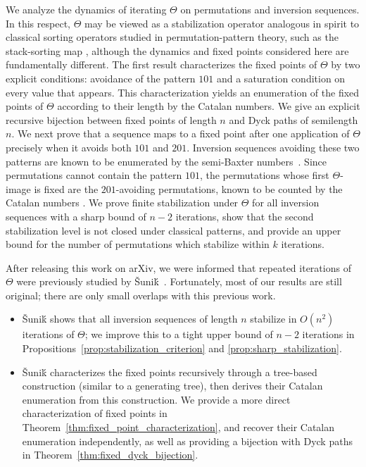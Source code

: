 \documentclass[11pt]{article}
\theoremstyle{remark}
\theoremstyle{definition}
\begin{document}
We analyze the dynamics of iterating $\Theta$ on permutations and inversion sequences. In this respect, $\Theta$ may be viewed as a stabilization operator analogous in spirit to classical sorting operators studied in permutation-pattern theory, such as the stack-sorting map \cite{Albert_Bouvel_Feray_2020,West_1993}, although the dynamics and fixed points considered here are fundamentally different. The first result characterizes the fixed points of $\Theta$ by two explicit conditions: avoidance of the pattern $101$ and a saturation condition on every value that appears. This characterization yields an enumeration of the fixed points of $\Theta$ according to their length by the Catalan numbers. We give an explicit recursive bijection between fixed points of length $n$ and Dyck paths of semilength $n$. We next prove that a sequence maps to a fixed point after one application of $\Theta$ precisely when it avoids both $101$ and $201$. Inversion sequences avoiding these two patterns are known to be enumerated by the semi-Baxter numbers~\cite{Bouvel_Guerrini_Rechnitzer_Rinaldi_2018,Martinez_Savage_2018}. 
Since permutations cannot contain the pattern $101$, the permutations whose first $\Theta$-image is fixed are the $201$-avoiding permutations, known to be counted by the Catalan numbers \cite{Knuth_1998, Simion_Schmidt_1985}. We prove finite stabilization under $\Theta$ for all inversion sequences with a sharp bound of $n-2$ iterations, show that the second stabilization level is not closed under classical patterns, and provide an upper bound for the number of permutations which stabilize within $k$ iterations.

\medskip

After releasing this work on arXiv, we were informed that repeated iterations of $\Theta$ were previously studied by \v Suni\'k~\cite{Sunik_2003}. Fortunately, most of our results are still original; there are only small overlaps with this previous work.
\begin{itemize}
    \item \v Suni\'k shows that all inversion sequences of length $n$ stabilize in $O(n^2)$ iterations of $\Theta$; we improve this to a tight upper bound of $n-2$ iterations in Propositions~\ref{prop:stabilization_criterion} and \ref{prop:sharp_stabilization}.
    \item \v Suni\'k characterizes the fixed points recursively through a tree-based construction (similar to a generating tree), then derives their Catalan enumeration from this construction. We provide a more direct characterization of fixed points in Theorem~\ref{thm:fixed_point_characterization}, and recover their Catalan enumeration independently, as well as providing a bijection with Dyck paths in Theorem~\ref{thm:fixed_dyck_bijection}.
\end{itemize}
\end{document}
